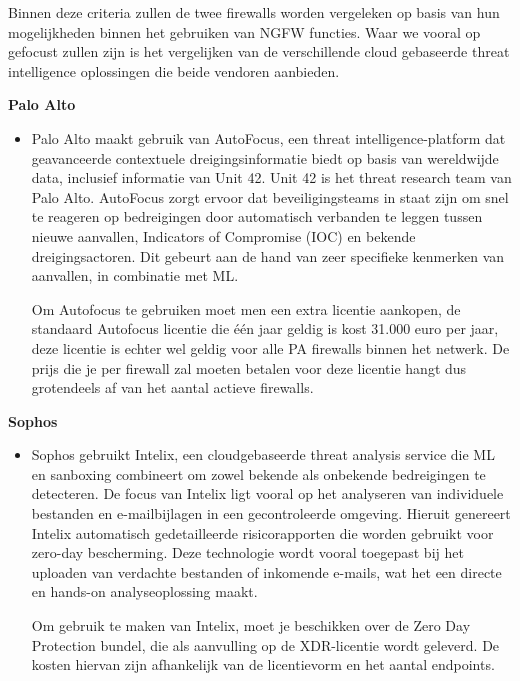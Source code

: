 Binnen deze criteria zullen de twee firewalls worden vergeleken op basis van hun mogelijkheden binnen het gebruiken van NGFW functies. Waar we vooral op gefocust zullen zijn is het vergelijken van de verschillende cloud gebaseerde threat intelligence oplossingen die beide vendoren aanbieden.


\textbf{Palo Alto}
\begin{itemize}[label=\textbullet]
    \item Palo Alto maakt gebruik van AutoFocus, een threat intelligence-platform dat geavanceerde contextuele dreigingsinformatie biedt op basis van wereldwijde data, inclusief informatie van Unit 42. Unit 42 is het threat research team van Palo Alto. AutoFocus zorgt ervoor dat beveiligingsteams in staat zijn om snel te reageren op bedreigingen door automatisch verbanden te leggen tussen nieuwe aanvallen, Indicators of Compromise (IOC) en bekende dreigingsactoren. Dit gebeurt aan de hand van zeer specifieke kenmerken van aanvallen, in combinatie met ML.\autocite{PaloAltoAF2025}
    
    Om Autofocus te gebruiken moet men een extra licentie aankopen, de standaard Autofocus licentie die één jaar geldig is kost 31.000 euro per jaar, deze licentie is echter wel geldig voor alle PA firewalls binnen het netwerk. De prijs die je per firewall zal moeten betalen voor deze licentie hangt dus grotendeels af van het aantal actieve firewalls.
\end{itemize}

\textbf{Sophos}
\begin{itemize}[label=\textbullet]
    \item Sophos gebruikt Intelix, een cloudgebaseerde threat analysis service die ML en sanboxing combineert om zowel bekende als onbekende bedreigingen te detecteren. De focus van Intelix ligt vooral op het analyseren van individuele bestanden en e-mailbijlagen in een gecontroleerde omgeving. Hieruit genereert Intelix automatisch gedetailleerde risicorapporten die worden gebruikt voor zero-day bescherming. Deze technologie wordt vooral toegepast bij het uploaden van verdachte bestanden of inkomende e-mails, wat het een directe en hands-on analyseoplossing maakt. \autocite{SophosIN2025}
    
    Om gebruik te maken van Intelix, moet je beschikken over de Zero Day Protection bundel, die als aanvulling op de XDR-licentie wordt geleverd. De kosten hiervan zijn afhankelijk van de licentievorm en het aantal endpoints.
\end{itemize}




